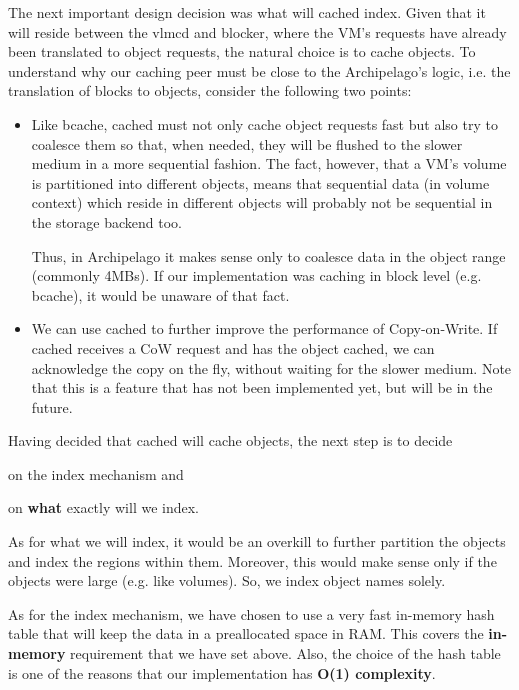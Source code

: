 The next important design decision was what will cached index. Given that it 
will reside between the vlmcd and blocker, where the VM's requests have already 
been translated to object requests, the natural choice is to cache objects. To 
understand why our caching peer must be close to the Archipelago's logic, i.e.  
the translation of blocks to objects, consider the following two points:

\begin{itemize}
\item Like bcache, cached must not only cache object requests fast but also try 
	to coalesce them so that, when needed, they will be flushed to the 
	slower medium in a more sequential fashion. The fact, however, that a 
	VM's volume is partitioned into different objects, means that 
	sequential data (in volume context) which reside in different objects 
	will probably not be sequential in the storage backend too.
	
	Thus, in Archipelago it makes sense only to coalesce data in the object 
	range (commonly 4MBs). If our implementation was caching in block level 
	(e.g. bcache), it would be unaware of that fact.
\item We can use cached to further improve the performance of Copy-on-Write.  
	If cached receives a CoW request and has the object cached, we can
	acknowledge the copy on the fly, without waiting for the slower medium.  
	Note that this is a feature that has not been implemented yet, but will be 
	in the future.
\end{itemize}

Having decided that cached will cache objects, the next step is to decide
\begin{inparaenum}[i)]
\item on the index mechanism and
\item on \textbf{what} exactly will we index.
\end{inparaenum}

As for what we will index, it would be an overkill to further partition the 
objects and index the regions within them. Moreover, this would make sense only 
if the objects were large (e.g. like volumes). So, we index object names 
solely.

As for the index mechanism, we have chosen to use a very fast in-memory hash 
table that will keep the data in a preallocated space in RAM. This covers the 
\textbf{in-memory} requirement that we have set above. Also, the choice of the 
hash table is one of the reasons that our implementation has \textbf{O(1) 
	complexity}.

